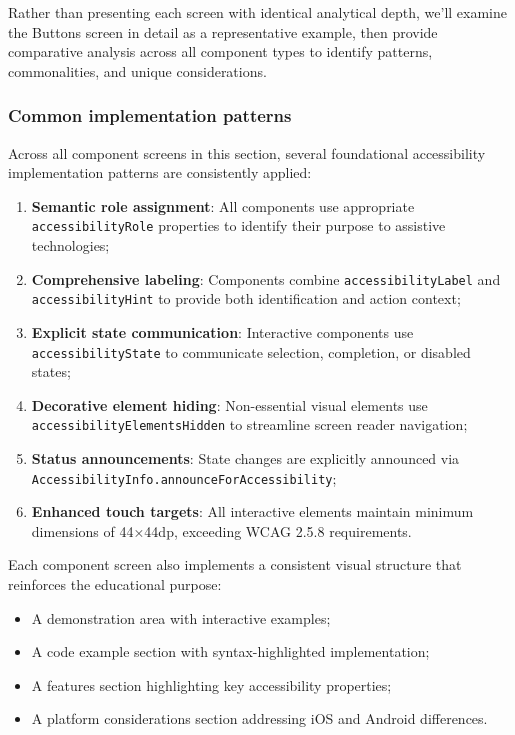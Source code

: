 Rather than presenting each screen with identical analytical depth, we'll examine the Buttons screen in detail as a representative example, then provide comparative analysis across all component types to identify patterns, commonalities, and unique considerations.

\subsubsection{Common implementation patterns}
\label{subsubsec:common-patterns}

Across all component screens in this section, several foundational accessibility implementation patterns are consistently applied:

\begin{enumerate}
    \item \textbf{Semantic role assignment}: All components use appropriate \texttt{accessibilityRole} properties to identify their purpose to assistive technologies;
    
    \item \textbf{Comprehensive labeling}: Components combine \texttt{accessibilityLabel} and \\\texttt{accessibilityHint} to provide both identification and action context;
    
    \item \textbf{Explicit state communication}: Interactive components use \texttt{accessibilityState} to communicate selection, completion, or disabled states;
    
    \item \textbf{Decorative element hiding}: Non-essential visual elements use \\\texttt{accessibilityElementsHidden} to streamline screen reader navigation;
    
    \item \textbf{Status announcements}: State changes are explicitly announced via \\\texttt{AccessibilityInfo.announceForAccessibility};
    
    \item \textbf{Enhanced touch targets}: All interactive elements maintain minimum dimensions of 44×44dp, exceeding WCAG 2.5.8 requirements.
\end{enumerate}

Each component screen also implements a consistent visual structure that reinforces the educational purpose:

\begin{itemize}
    \item A demonstration area with interactive examples;
    \item A code example section with syntax-highlighted implementation;
    \item A features section highlighting key accessibility properties;
    \item A platform considerations section addressing iOS and Android differences.
\end{itemize}


